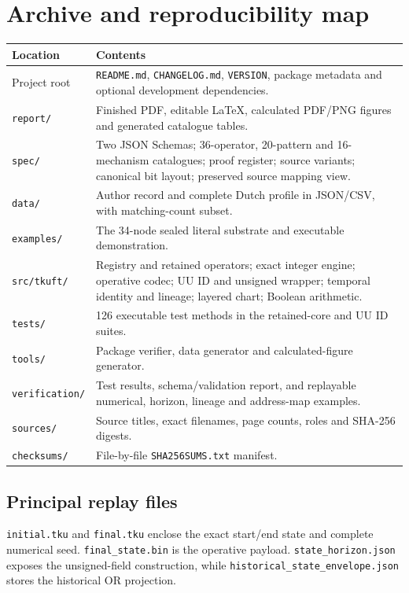 \documentclass[11pt,a4paper]{article}
\numberwithin{equation}{section}
\newcommand{\newsec}[1]{\clearpage\section{#1}}
\begin{document}
\newsec{Archive and reproducibility map}
\label{app:archive}
\begin{tabularx}{\textwidth}{@{}p{}X@{}}
\toprule\textbf{Location} & \textbf{Contents}\\\midrule
Project root & \texttt{README.md}, \texttt{CHANGELOG.md}, \texttt{VERSION}, package metadata and optional development dependencies.\\[7pt]
\texttt{report/} & Finished PDF, editable LaTeX, calculated PDF/PNG figures and generated catalogue tables.\\[7pt]
\texttt{spec/} & Two JSON Schemas; 36-operator, 20-pattern and 16-mechanism catalogues; proof register; source variants; canonical bit layout; preserved source mapping view.\\[7pt]
\texttt{data/} & Author record and complete Dutch profile in JSON/CSV, with matching-count subset.\\[7pt]
\texttt{examples/} & The 34-node sealed literal substrate and executable demonstration.\\[7pt]
\texttt{src/tkuft/} & Registry and retained operators; exact integer engine; operative codec; UU ID and unsigned wrapper; temporal identity and lineage; layered chart; Boolean arithmetic.\\[7pt]
\texttt{tests/} & 126 executable test methods in the retained-core and UU ID suites.\\[7pt]
\texttt{tools/} & Package verifier, data generator and calculated-figure generator.\\[7pt]
\texttt{verification/} & Test results, schema/validation report, and replayable numerical, horizon, lineage and address-map examples.\\[7pt]
\texttt{sources/} & Source titles, exact filenames, page counts, roles and SHA-256 digests.\\[7pt]
\texttt{checksums/} & File-by-file \texttt{SHA256SUMS.txt} manifest.\\
\bottomrule
\end{tabularx}

\subsection*{Principal replay files}
\texttt{initial.tku} and \texttt{final.tku} enclose the exact start/end state and complete numerical seed. \texttt{final\_state.bin} is the operative payload. \texttt{state\_horizon.json} exposes the unsigned-field construction, while \texttt{historical\_state\_envelope.json} stores the historical OR projection.
\end{document}
